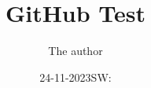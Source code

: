 \documentclass[11pt]{book}
\title{GitHub Test}
\author{The author}
\date{24-11-2023SW:}
\begin{document}
\maketitle
\def\title#1{\chapter{#1}}
\tableofcontents

        
        
        
        
        
        
\end{document}
